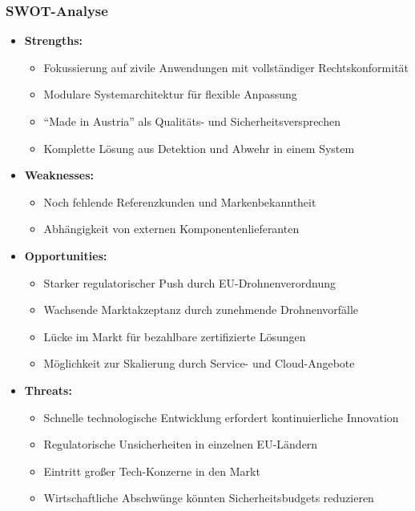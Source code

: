 \documentclass[11pt,a4paper]{article}
\begin{document}
\subsubsection*{SWOT-Analyse}
\begin{itemize}
\item \textbf{Strengths:}
\begin{itemize}
\item Fokussierung auf zivile Anwendungen mit vollständiger Rechtskonformität
\item Modulare Systemarchitektur für flexible Anpassung
\item ``Made in Austria'' als Qualitäts- und Sicherheitsversprechen
\item Komplette Lösung aus Detektion und Abwehr in einem System
\end{itemize}

\item \textbf{Weaknesses:}
\begin{itemize}
\item Noch fehlende Referenzkunden und Markenbekanntheit
\item Abhängigkeit von externen Komponentenlieferanten
\end{itemize}

\item \textbf{Opportunities:}
\begin{itemize}
\item Starker regulatorischer Push durch EU-Drohnenverordnung
\item Wachsende Marktakzeptanz durch zunehmende Drohnenvorfälle
\item Lücke im Markt für bezahlbare zertifizierte Lösungen
\item Möglichkeit zur Skalierung durch Service- und Cloud-Angebote
\end{itemize}

\item \textbf{Threats:}
\begin{itemize}
\item Schnelle technologische Entwicklung erfordert kontinuierliche Innovation
\item Regulatorische Unsicherheiten in einzelnen EU-Ländern
\item Eintritt großer Tech-Konzerne in den Markt
\item Wirtschaftliche Abschwünge könnten Sicherheitsbudgets reduzieren
\end{itemize}
\end{itemize}
\end{document}
